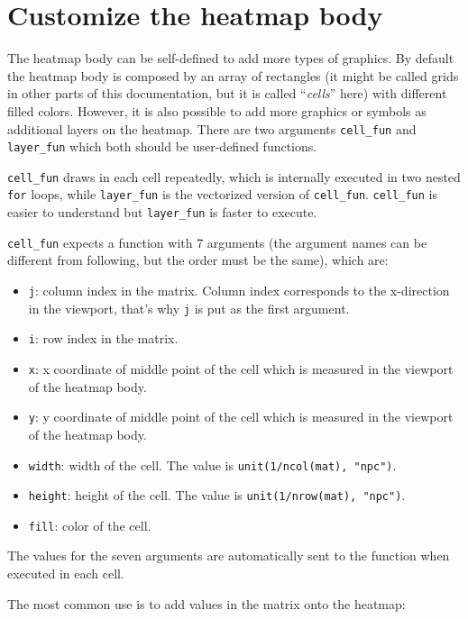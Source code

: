 \documentclass[]{book}
\providecommand{\tightlist}{%
  \setlength{\itemsep}{0pt}\setlength{\parskip}{0pt}}
\theoremstyle{definition}
\theoremstyle{definition}
\theoremstyle{definition}
\theoremstyle{remark}
\begin{document}
\section{Customize the heatmap body}\label{customize-the-heatmap-body}

The heatmap body can be self-defined to add more types of graphics. By
default the heatmap body is composed by an array of rectangles (it might
be called grids in other parts of this documentation, but it is called
``\emph{cells}'' here) with different filled colors. However, it is also
possible to add more graphics or symbols as additional layers on the
heatmap. There are two arguments \texttt{cell\_fun} and
\texttt{layer\_fun} which both should be user-defined functions.

\texttt{cell\_fun} draws in each cell repeatedly, which is internally
executed in two nested \texttt{for} loops, while \texttt{layer\_fun} is
the vectorized version of \texttt{cell\_fun}. \texttt{cell\_fun} is
easier to understand but \texttt{layer\_fun} is faster to execute.

\texttt{cell\_fun} expects a function with 7 arguments (the argument
names can be different from following, but the order must be the same),
which are:

\begin{itemize}
\tightlist
\item
  \texttt{j}: column index in the matrix. Column index corresponds to
  the x-direction in the viewport, that's why \texttt{j} is put as the
  first argument.
\item
  \texttt{i}: row index in the matrix.
\item
  \texttt{x}: x coordinate of middle point of the cell which is measured
  in the viewport of the heatmap body.
\item
  \texttt{y}: y coordinate of middle point of the cell which is measured
  in the viewport of the heatmap body.
\item
  \texttt{width}: width of the cell. The value is
  \texttt{unit(1/ncol(mat),\ "npc")}.
\item
  \texttt{height}: height of the cell. The value is
  \texttt{unit(1/nrow(mat),\ "npc")}.
\item
  \texttt{fill}: color of the cell.
\end{itemize}

The values for the seven arguments are automatically sent to the
function when executed in each cell.

The most common use is to add values in the matrix onto the heatmap:
\end{document}
